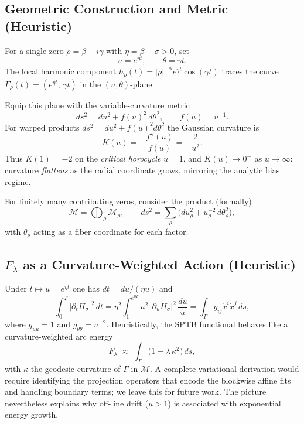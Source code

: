 \subsection{Geometric Construction and Metric (Heuristic)}

For a single zero $\rho=\beta+i\gamma$ with $\eta=\beta-\sigma>0$, set
\[
u = e^{\eta t}, \qquad \theta = \gamma t .
\]
The local harmonic component
$h_\rho(t)=|\rho|^{-\alpha} e^{\eta t}\cos(\gamma t)$ traces the curve
$\Gamma_\rho(t)=(e^{\eta t},\,\gamma t)$ in the $(u,\theta)$-plane.

Equip this plane with the variable-curvature metric
\begin{equation}
ds^2 = du^2 + f(u)^2\, d\theta^2, \qquad f(u)=u^{-1}.
\tag{16.1}
\end{equation}
For warped products $ds^2=du^2+f(u)^2 d\theta^2$ the Gaussian curvature is
\begin{equation}
K(u)=-\frac{f''(u)}{f(u)}=-\frac{2}{u^2}.
\tag{16.2}
\end{equation}
Thus $K(1)=-2$ on the \emph{critical horocycle} $u=1$, and $K(u)\to 0^-$ as
$u\to\infty$: curvature \emph{flattens} as the radial coordinate grows, mirroring
the analytic bias regime.

For finitely many contributing zeros, consider the product (formally)
\[
\mathcal{M}=\bigoplus_\rho \mathcal{M}_\rho,
\qquad
ds^2=\sum_\rho \bigl(du_\rho^2 + u_\rho^{-2}\, d\theta_\rho^2\bigr),
\tag{16.3}
\]
with $\theta_\rho$ acting as a fiber coordinate for each factor.

\subsection{\texorpdfstring{$F_\lambda$}{Fλ} as a Curvature-Weighted Action (Heuristic)}

Under $t\mapsto u=e^{\eta t}$ one has $dt=du/(\eta u)$ and
\[
\int_0^T |\partial_t H_\sigma|^2\,dt
= \eta^2\!\!\int_{1}^{e^{\eta T}} u^2\,|\partial_u H_\sigma|^2\,\frac{du}{u}
= \int_\Gamma g_{ij}\dot{x}^i\dot{x}^j\,ds,
\]
where $g_{uu}=1$ and $g_{\theta\theta}=u^{-2}$.
Heuristically, the SPTB functional behaves like a curvature-weighted arc energy
\[
F_\lambda \;\approx\; \int_\Gamma \bigl(1+\lambda\,\kappa^2\bigr)\,ds ,
\]
with $\kappa$ the geodesic curvature of $\Gamma$ in $\mathcal{M}$. A complete
variational derivation would require identifying the projection operators that
encode the blockwise affine fits and handling boundary terms; we leave this for
future work. The picture nevertheless explains why off-line drift ($u>1$) is
associated with exponential energy growth.

